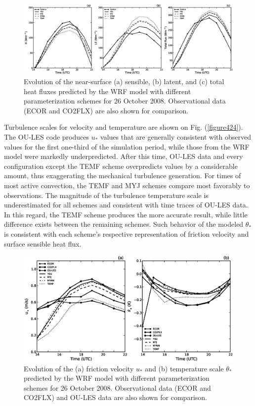 \begin{figure}[ht!]
\begin{center}
\includegraphics[width=\textwidth]{figures/chapter4/shf_lhf_phys_20081026}
\end{center}
\caption{Evolution of the near-surface (a) sensible, (b) latent, and (c) total heat fluxes predicted by the WRF model with different parameterization schemes for 26 October 2008. Observational data (ECOR and CO2FLX) are also shown for comparison.}
\label{figure423}
\end{figure}


Turbulence scales for velocity and temperature are shown on Fig. (\autoref{figure424}). The OU-LES code produces $u_*$ values that are generally consistent with observed values for the first one-third of the simulation period, while those from the WRF model were markedly underpredicted. After this time, OU-LES data and every configuration except the TEMF scheme overpredicts values by a considerable amount, thus exaggerating the mechanical turbulence generation. For times of most active convection, the TEMF and MYJ schemes compare most favorably to observations. The magnitude of the turbulence temperature scale is underestimated for all schemes and consistent with time traces of OU-LES data. In this regard, the TEMF scheme produces the more accurate result, while little difference exists between the remaining schemes. Such behavior of the modeled $\theta_*$ is consistent with each scheme's respective representation of friction velocity and surface sensible heat flux.


\begin{figure}[ht!]
\begin{center}
\includegraphics[width=\textwidth]{figures/chapter4/ust_tst_phys_20081026}
\end{center}
\caption{Evolution of the (a) friction velocity $u_*$ and (b) temperature scale $\theta_*$ predicted by the WRF model with different parameterization schemes for 26 October 2008. Observational data (ECOR and CO2FLX) and OU-LES data are also shown for comparison.}
\label{figure424}
\end{figure}


